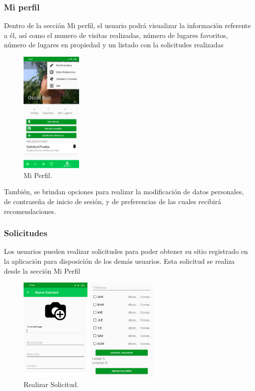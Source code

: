 \documentclass[12pt,letterpaper,openany]{book}
\begin{document}
\subsubsection{Mi perfil}
Dentro de la sección Mi perfil, el usuario podrá visualizar la información referente a él, así como el numero de visitas realizadas, número de  lugares favoritos, número de lugares en propiedad y un listado con la solicitudes realizadas\\
\begin{figure}[H]
\begin{center}
\includegraphics[width=3cm]{./imagenes/5}
\caption{Mi Perfil.}
\end{center}
\end{figure}
También, se brindan opciones para realizar la modificación de datos personales, de contraseña de inicio de sesión, y de preferencias de las cuales recibirá recomendaciones.

\subsubsection{Solicitudes}
Los usuarios pueden realizar solicitudes para poder obtener su sitio registrado en la aplicación para disposición de los demás usuarios. Esta solicitud se realiza desde la sección Mi Perfil\\
\begin{figure}[H]
\begin{center}
\includegraphics[width=7cm]{./imagenes/6}
\caption{Realizar Solicitud.}
\end{center}
\end{figure}
\end{document}
